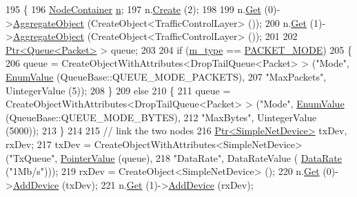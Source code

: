 \begin{DoxyCode}
195 \{
196   \hyperlink{classns3_1_1NodeContainer}{NodeContainer} \hyperlink{namespacesample-rng-plot_aeb5ee5c431e338ef39b7ac5431242e1d}{n};
197   n.\hyperlink{classns3_1_1NodeContainer_a787f059e2813e8b951cc6914d11dfe69}{Create} (2);
198 
199   n.\hyperlink{classns3_1_1NodeContainer_a9ed96e2ecc22e0f5a3d4842eb9bf90bf}{Get} (0)->\hyperlink{classns3_1_1Object_a79dd435d300f3deca814553f561a2922}{AggregateObject} (CreateObject<TrafficControlLayer> ());
200   n.\hyperlink{classns3_1_1NodeContainer_a9ed96e2ecc22e0f5a3d4842eb9bf90bf}{Get} (1)->\hyperlink{classns3_1_1Object_a79dd435d300f3deca814553f561a2922}{AggregateObject} (CreateObject<TrafficControlLayer> ());
201 
202   \hyperlink{classns3_1_1Ptr}{Ptr<Queue<Packet>} > queue;
203 
204   \textcolor{keywordflow}{if} (\hyperlink{classTcFlowControlTestCase_a48b76fa61206d08fadd399b379bdbf56}{m\_type} == \hyperlink{classTcFlowControlTestCase_a63146d60b911dd039c9cf960cbddb458a294d1e27d6e81fc7a19f37ec1f5ba1d8}{PACKET\_MODE})
205     \{
206       queue = CreateObjectWithAttributes<DropTailQueue<Packet> > (\textcolor{stringliteral}{"Mode"}, 
      \hyperlink{classns3_1_1EnumValue}{EnumValue} (QueueBase::QUEUE\_MODE\_PACKETS),
207                                                                   \textcolor{stringliteral}{"MaxPackets"}, UintegerValue (5));
208     \}
209   \textcolor{keywordflow}{else}
210     \{
211       queue = CreateObjectWithAttributes<DropTailQueue<Packet> > (\textcolor{stringliteral}{"Mode"}, 
      \hyperlink{classns3_1_1EnumValue}{EnumValue} (QueueBase::QUEUE\_MODE\_BYTES),
212                                                                   \textcolor{stringliteral}{"MaxBytes"}, UintegerValue (5000));
213     \}
214 
215   \textcolor{comment}{// link the two nodes}
216   \hyperlink{classns3_1_1Ptr}{Ptr<SimpleNetDevice>} txDev, rxDev;
217   txDev = CreateObjectWithAttributes<SimpleNetDevice> (\textcolor{stringliteral}{"TxQueue"}, \hyperlink{classns3_1_1PointerValue}{PointerValue} (queue),
218                                                        \textcolor{stringliteral}{"DataRate"}, DataRateValue (
      \hyperlink{classns3_1_1DataRate}{DataRate} (\textcolor{stringliteral}{"1Mb/s"})));
219   rxDev = CreateObject<SimpleNetDevice> ();
220   n.\hyperlink{classns3_1_1NodeContainer_a9ed96e2ecc22e0f5a3d4842eb9bf90bf}{Get} (0)->\hyperlink{classns3_1_1Node_a42ff83ee1d5d1649c770d3f5b62375de}{AddDevice} (txDev);
221   n.\hyperlink{classns3_1_1NodeContainer_a9ed96e2ecc22e0f5a3d4842eb9bf90bf}{Get} (1)->\hyperlink{classns3_1_1Node_a42ff83ee1d5d1649c770d3f5b62375de}{AddDevice} (rxDev);

\end{DoxyCode}
